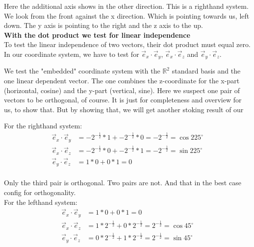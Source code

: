 \documentclass[a4paper]{article}
\begin{document}
\begin{Example}
\begin{PropositionOpt4}
Here the additional axis shows in the other direction. This is a righthand system. We look from the front against the x direction.
Which is pointing towards us, left down. The y axis is pointing to the right and the z axis to the up.\\

\textbf{With the dot product we test for linear independence}\\

To test the linear independence of two vectors, their dot product must equal zero.\\

In our coordinate system, we have to test for $\vec{e}_{x}\cdot\vec{e}_{y}$, $\vec{e}_{x}\cdot\vec{e}_{z}$ and $\vec{e}_{y}\cdot\vec{e}_{z}$.

We test the "embedded" coordinate system with the $\mathbb{R}^{2}$ standard basis and the one linear dependent vector. The one combines the z-coordinate for the x-part (horizontal, cosine) and the y-part (vertical, sine). Here we suspect one pair of vectors to be orthogonal, of course. It is just for completeness and overview for us, to show that. But by 
showing that, we will get another stoking result of our

For the righthand system:\\

\begin{displaymath}
\begin{align}
\vec{e}_{x}\cdot\vec{e}_{y} &= -2^{-\frac12}*1 + -2^{-\frac12}*0 = -2^{-\frac12} = \cos225^{\circ}\\
\vec{e}_{x}\cdot\vec{e}_{z} &= -2^{-\frac12}*0 + -2^{-\frac12}*1 = -2^{-\frac12} = \sin225^{\circ}\\
\vec{e}_{y}\cdot\vec{e}_{z} &= 1*0+0*1 = 0\\
\end{align}
\end{displaymath}

Only the third pair is orthogonal. Two pairs are not. And that in the best case config for orthogonality.\\

For the lefthand system:\\

\begin{displaymath}
\begin{align}
\vec{e}_{x}\cdot\vec{e}_{y} &= 1*0+0*1 = 0\\
\vec{e}_{x}\cdot\vec{e}_{z} &= 1*2^{-\frac12} + 0*2^{-\frac12} = 2^{-\frac12} = \cos45^{\circ}\\
\vec{e}_{y}\cdot\vec{e}_{z} &= 0*2^{-\frac12} + 1*2^{-\frac12} = 2^{-\frac12} = \sin45^{\circ}\\
\end{align}
\end{displaymath}


\end{PropositionOpt4}
\end{Example}
\end{document}
